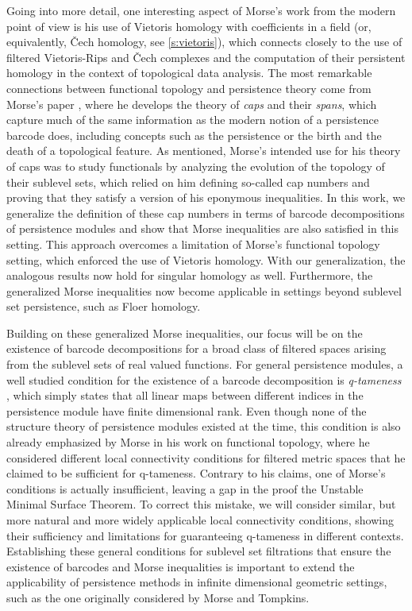 Going into more detail, one interesting aspect of Morse's work from the modern point of view is his use of Vietoris homology with coefficients in a field (or, equivalently, \v{C}ech homology, see \cref{s:vietoris}), which connects closely to the use of filtered Vietoris-Rips and \v{C}ech complexes and the computation of their persistent homology in the context of topological data analysis.
The most remarkable connections between functional topology and persistence theory come from Morse's paper \cite{Morse.1940}, where he develops the theory of \emph{caps} and their \emph{spans}, which capture much of the same information as the modern notion of a persistence barcode does, including concepts such as the persistence or the birth and the death of a topological feature.
As mentioned, Morse's intended use for his theory of caps was to study functionals by analyzing the evolution of the topology of their sublevel sets, which relied on him defining so-called cap numbers and proving that they satisfy a version of his eponymous inequalities.
In this work, we generalize the definition of these cap numbers in terms of barcode decompositions of persistence modules and show that Morse inequalities are also satisfied in this setting.
This approach overcomes a limitation of Morse's functional topology setting, which enforced the use of Vietoris homology.
With our generalization, the analogous results now hold for singular homology as well.
Furthermore, the generalized Morse inequalities now become applicable in settings beyond sublevel set persistence, such as Floer homology.

Building on these generalized Morse inequalities, our focus will be on the existence of barcode decompositions for a broad class of filtered spaces arising from the sublevel sets of real valued functions.  
For general persistence modules, a well studied condition for the existence of a barcode decomposition is \emph{q-tameness} \cite{Chazal.2016a,Chazal.2016b}, which simply states that all linear maps between different indices in the persistence module have finite dimensional rank.
Even though none of the structure theory of persistence modules existed at the time, this condition is also already emphasized by Morse in his work on functional topology, where he considered different local connectivity conditions for filtered metric spaces that he claimed to be sufficient for q-tameness.
Contrary to his claims, one of Morse's conditions is actually insufficient, leaving a gap in the proof the Unstable Minimal Surface Theorem.
To correct this mistake, we will consider similar, but more natural and more widely applicable local connectivity conditions,
showing their sufficiency and limitations for guaranteeing q-tameness in different contexts.
Establishing these general conditions for sublevel set filtrations that ensure the existence of barcodes and Morse inequalities is important to extend the applicability of persistence methods in infinite dimensional geometric settings, such as the one originally considered by Morse and Tompkins.


